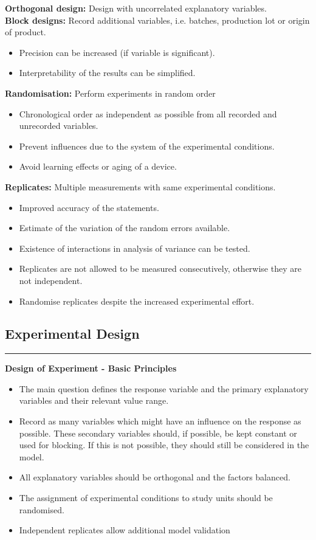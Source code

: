 \textbf{Orthogonal design:} Design with uncorrelated explanatory variables.\\

\textbf{Block designs:} Record additional variables, i.e. batches, production lot or origin of product.
\begin{itemize}
  \item Precision can be increased (if variable is significant).
  \item Interpretability of the results can be simplified.
\end{itemize}

\textbf{Randomisation:} Perform experiments in random order
\begin{itemize}
  \item Chronological order as independent as possible from all recorded and unrecorded variables.
  \item Prevent influences due to the system of the experimental conditions.
  \item Avoid learning effects or aging of a device.
\end{itemize}

\textbf{Replicates:} Multiple measurements with same experimental conditions.
\begin{itemize}
  \item Improved accuracy of the statements.
  \item Estimate of the variation of the random errors available.
  \item Existence of interactions in analysis of variance can be tested.
  \item Replicates are not allowed to be measured consecutively, otherwise they are not independent.
  \item Randomise replicates despite the increased experimental effort.
\end{itemize}

\subsection{Experimental Design}
\noindent\rule[\linienAbstand]{\linewidth}{\linienDicke}
\textbf{Design of Experiment - Basic Principles}
\begin{itemize}
  \item The main question defines the response variable and the primary explanatory variables   and their relevant value range.
  \item Record as many variables which might have an influence on the response as possible.   These secondary variables should, if possible, be kept constant or used for blocking. If   this is not possible, they should still be considered in the model.
  \item All explanatory variables should be orthogonal and the factors balanced.
  \item The assignment of experimental conditions to study units should be randomised.
  \item Independent replicates allow additional model validation
\end{itemize}

